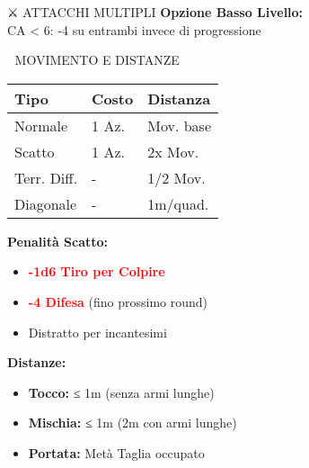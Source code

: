 \documentclass[10pt,a4paper,landscape]{article}
\newcommand{\critical}[1]{\textcolor{red}{\textbf{#1}}}
\begin{document}
\begin{multicols}{4}
\begin{mainsection}{⚔️ ATTACCHI MULTIPLI}
			\textbf{Opzione Basso Livello:}\\
			CA < 6: -4 su entrambi invece di progressione
		\end{mainsection}
		
		\begin{mainsection}{🏃 MOVIMENTO E DISTANZE}
			\begin{tabular}{@{}p{2cm}p{1cm}p{2.5cm}@{}}
				\toprule
				\textbf{Tipo} & \textbf{Costo} & \textbf{Distanza} \\
				\midrule
				Normale & 1 Az. & Mov. base \\
				Scatto & 1 Az. & 2x Mov. \\
				Terr. Diff. & - & 1/2 Mov. \\
				Diagonale & - & 1m/quad. \\
				\bottomrule
			\end{tabular}
			
			\textbf{Penalità Scatto:}
			\begin{itemize}[noitemsep,leftmargin=8pt]
				\item \critical{-1d6 Tiro per Colpire}
				\item \critical{-4 Difesa} (fino prossimo round)
				\item Distratto per incantesimi
			\end{itemize}
			
			\textbf{Distanze:}
			\begin{itemize}[noitemsep,leftmargin=8pt]
				\item \textbf{Tocco:} ≤ 1m (senza armi lunghe)
				\item \textbf{Mischia:} ≤ 1m (2m con armi lunghe)
				\item \textbf{Portata:} Metà Taglia occupato
			\end{itemize}
		\end{mainsection}
		
		\columnbreak
		

\end{multicols}
\end{document}
